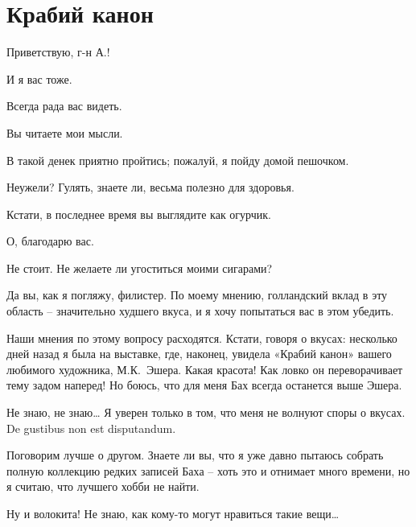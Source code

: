 \documentclass[../main.tex]{subfiles}
\begin{document}
\section{Крабий канон}


\begin{Dialogue}

 Приветствую, г-н А.!

 И я вас тоже.

 Всегда рада вас видеть.

 Вы читаете мои мысли.

 В такой денек приятно пройтись; пожалуй, я пойду домой пешочком.

 Неужели? Гулять, знаете ли, весьма полезно для здоровья.

 Кстати, в последнее время вы выглядите как огурчик.

 О, благодарю вас.

 Не стоит. Не желаете ли угоститься моими сигарами?

 Да вы, как я погляжу, филистер. По моему мнению, голландский вклад в эту область \--- значительно худшего вкуса, и я хочу попытаться вас в этом убедить.

 Наши мнения по этому вопросу расходятся. Кстати, говоря о вкусах: несколько дней назад я была на выставке, где, наконец, увидела «Крабий канон» вашего любимого художника, М.К.~Эшера. Какая красота! Как ловко он переворачивает тему задом наперед! Но боюсь, что для меня Бах всегда останется выше Эшера.

 Не знаю, не знаю\ldots{} Я уверен только в том, что меня не волнуют споры о вкусах. De gustibus non est disputandum.

 Поговорим лучше о другом. Знаете ли вы, что я уже давно пытаюсь собрать полную коллекцию редких записей Баха \--- хоть это и отнимает много времени, но я считаю, что лучшего хобби не найти.

 Ну и волокита! Не знаю, как кому-то могут нравиться такие вещи\ldots{}



\end{Dialogue}
\end{document}
